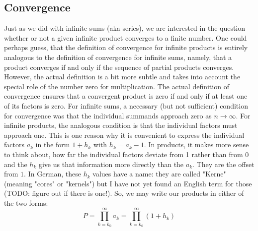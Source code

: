 \subsection{Convergence}
Just as we did with infinite sums (aka series), we are interested in the question whether or not a given infinite product converges to a finite number. One could perhaps guess, that the definition of convergence for infinite products is entirely analogous to the definition of convergence for infinite sums, namely, that a product converges if and only if the sequence of partial products converges. However, the actual definition is a bit more subtle and takes into account the special role of the number zero for multiplication. The actual definition of convergence ensures that a convergent product is zero if and only if at least one of its factors is zero. 
For infinite sums, a necessary (but not sufficient) condition for convergence was that the individual summands approach zero as $n \rightarrow \infty$. For infinite products, the analogous condition is that the individual factors must approach one. This is one reason why it is convenient to express the individual factors $a_k$ in the form $1 + h_k$ with $h_k = a_k - 1$. In products, it makes more sense to think about, how far the individual factors deviate from 1 rather than from 0 and the $h_k$ give us that information more directly than the $a_k$. They are the offset from $1$. In German, these $h_k$ values have a name: they are called "Kerne" (meaning "cores" or "kernels") but I have not yet found an English term for those (TODO: figure out if there is one!). So, we may write our products in either of the two forms:
\begin{equation}
 P = \prod_{k=k_0}^{\infty} a_k = \prod_{k=k_0}^{\infty} (1 + h_k) 
\end{equation}






